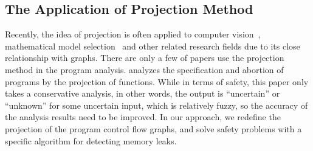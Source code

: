 \subsection{The Application of Projection Method}
Recently, the idea of projection is often applied to computer vision~\cite{DG14, HWS15}, mathematical model selection~\cite{NL10} and other related research fields due to its close relationship with graphs. There are only a few of papers use the projection method in the program analysis. \cite{D94} analyzes the specification and abortion of programs by the projection of functions. While in terms of safety, this paper only takes a conservative analysis, in other words, the output is ``uncertain” or ``unknown” for some uncertain input, which is relatively fuzzy, so the accuracy of the analysis results need to be improved. In our approach, we redefine the projection of the program control flow graphs, and solve safety problems with a specific algorithm for detecting memory leaks.
